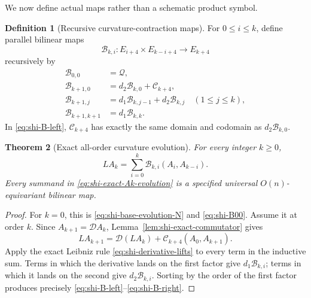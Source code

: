 \documentclass[10pt]{coll-l}
\newtheorem{theorem}{Theorem}[chapter]
\theoremstyle{definition}
\newtheorem{definition}[theorem]{Definition}
\theoremstyle{remark}
\numberwithin{section}{chapter}
\numberwithin{equation}{chapter}
\begin{document}
We now define actual maps rather than a schematic product symbol.

\begin{definition}[Recursive curvature-contraction maps]
\label{def:shi-Bki}
For $0\leq i\leq k$, define parallel bilinear maps
\[
 \mathcal B_{k,i}:E_{i+4}\times E_{k-i+4}\longrightarrow E_{k+4}
\]
recursively by
\begin{align}
 \mathcal B_{0,0}&=\mathcal Q,                            \label{eq:shi-B00}\\
 \mathcal B_{k+1,0}&=d_2\mathcal B_{k,0}+\mathcal C_{k+4},\label{eq:shi-B-left}\\
 \mathcal B_{k+1,j}&=d_1\mathcal B_{k,j-1}
                       +d_2\mathcal B_{k,j}
          \quad(1\leq j\leq k),                          \label{eq:shi-B-middle}\\
 \mathcal B_{k+1,k+1}&=d_1\mathcal B_{k,k}.              \label{eq:shi-B-right}
\end{align}
In \eqref{eq:shi-B-left}, $\mathcal C_{k+4}$ has exactly the same domain
and codomain as $d_2\mathcal B_{k,0}$.
\end{definition}

\begin{theorem}[Exact all-order curvature evolution]
\label{thm:shi-exact-all-order-evolution}
For every integer $k\geq0$,
\begin{equation}
       LA_k=\sum_{i=0}^k
          \mathcal B_{k,i}(A_i,A_{k-i}).                 \label{eq:shi-exact-Ak-evolution}
\end{equation}
Every summand in \eqref{eq:shi-exact-Ak-evolution} is a specified universal
$O(n)$-equivariant bilinear map.
\end{theorem}

\begin{proof}
For $k=0$, this is \eqref{eq:shi-base-evolution-N} and
\eqref{eq:shi-B00}.  Assume it at order $k$.  Since
$A_{k+1}=\mathcal DA_k$, Lemma~\ref{lem:shi-exact-commutator} gives
\[
 LA_{k+1}
   =\mathcal D(LA_k)+\mathcal C_{k+4}(A_0,A_{k+1}).
\]
Apply the exact Leibniz rule \eqref{eq:shi-derivative-lifts} to every term in
the inductive sum.  Terms in which the derivative lands on the first factor
give $d_1\mathcal B_{k,i}$; terms in which it lands on the second give
$d_2\mathcal B_{k,i}$.  Sorting by the order of the first factor produces
precisely \eqref{eq:shi-B-left}--\eqref{eq:shi-B-right}.
\end{proof}
\end{document}
